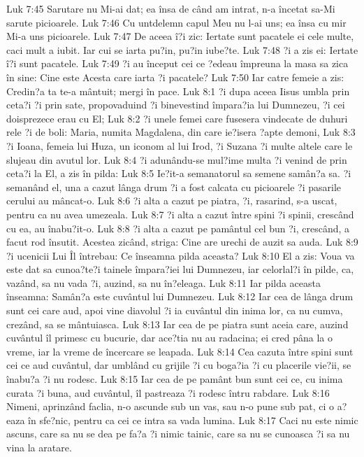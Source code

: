 Luk 7:45  Sarutare nu Mi-ai dat; ea însa de când am intrat, n-a încetat sa-Mi sarute picioarele.
Luk 7:46  Cu untdelemn capul Meu nu l-ai uns; ea însa cu mir Mi-a uns picioarele.
Luk 7:47  De aceea î?i zic: Iertate sunt pacatele ei cele multe, caci mult a iubit. Iar cui se iarta pu?in, pu?in iube?te.
Luk 7:48  ?i a zis ei: Iertate î?i sunt pacatele.
Luk 7:49  ?i au început cei ce ?edeau împreuna la masa sa zica în sine: Cine este Acesta care iarta ?i pacatele?
Luk 7:50  Iar catre femeie a zis: Credin?a ta te-a mântuit; mergi în pace.
Luk 8:1  ?i dupa aceea Iisus umbla prin ceta?i ?i prin sate, propovaduind ?i binevestind împara?ia lui Dumnezeu, ?i cei doisprezece erau cu El;
Luk 8:2  ?i unele femei care fusesera vindecate de duhuri rele ?i de boli: Maria, numita Magdalena, din care ie?isera ?apte demoni,
Luk 8:3  ?i Ioana, femeia lui Huza, un iconom al lui Irod, ?i Suzana ?i multe altele care le slujeau din avutul lor.
Luk 8:4  ?i adunându-se mul?ime multa ?i venind de prin ceta?i la El, a zis în pilda:
Luk 8:5  Ie?it-a semanatorul sa semene samân?a sa. ?i semanând el, una a cazut lânga drum ?i a fost calcata cu picioarele ?i pasarile cerului au mâncat-o.
Luk 8:6  ?i alta a cazut pe piatra, ?i, rasarind, s-a uscat, pentru ca nu avea umezeala.
Luk 8:7  ?i alta a cazut între spini ?i spinii, crescând cu ea, au înabu?it-o.
Luk 8:8  ?i alta a cazut pe pamântul cel bun ?i, crescând, a facut rod însutit. Acestea zicând, striga: Cine are urechi de auzit sa auda.
Luk 8:9  ?i ucenicii Lui Îl întrebau: Ce înseamna pilda aceasta?
Luk 8:10  El a zis: Voua va este dat sa cunoa?te?i tainele împara?iei lui Dumnezeu, iar celorlal?i în pilde, ca, vazând, sa nu vada ?i, auzind, sa nu în?eleaga.
Luk 8:11  Iar pilda aceasta înseamna: Samân?a este cuvântul lui Dumnezeu.
Luk 8:12  Iar cea de lânga drum sunt cei care aud, apoi vine diavolul ?i ia cuvântul din inima lor, ca nu cumva, crezând, sa se mântuiasca.
Luk 8:13  Iar cea de pe piatra sunt aceia care, auzind cuvântul îl primesc cu bucurie, dar ace?tia nu au radacina; ei cred pâna la o vreme, iar la vreme de încercare se leapada.
Luk 8:14  Cea cazuta între spini sunt cei ce aud cuvântul, dar umblând cu grijile ?i cu boga?ia ?i cu placerile vie?ii, se înabu?a ?i nu rodesc.
Luk 8:15  Iar cea de pe pamânt bun sunt cei ce, cu inima curata ?i buna, aud cuvântul, îl pastreaza ?i rodesc întru rabdare.
Luk 8:16  Nimeni, aprinzând faclia, n-o ascunde sub un vas, sau n-o pune sub pat, ci o a?eaza în sfe?nic, pentru ca cei ce intra sa vada lumina.
Luk 8:17  Caci nu este nimic ascuns, care sa nu se dea pe fa?a ?i nimic tainic, care sa nu se cunoasca ?i sa nu vina la aratare.
